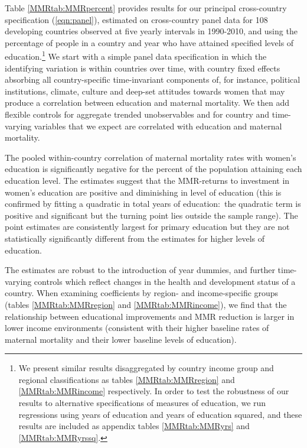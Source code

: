 \documentclass{article}[12pt,subeqn]
\begin{document}
\begin{spacing}{1.4}
Table \ref{MMRtab:MMRpercent} provides results for our principal cross-country 
specification (\ref{eqn:panel}), estimated on cross-country panel data for 108 
developing countries observed at five yearly intervals in 1990-2010, and using 
the percentage of people in a country and year who have attained specified levels
of education.\footnote{We present similar results disaggregated by country income
group and regional classifications as tables \ref{MMRtab:MMRregion} and
\ref{MMRtab:MMRincome} respectively. In order to test the robustness of our
results to alternative specifications of measures of education, we run regressions
using years of education and years of education squared, and these results are
included as appendix tables \ref{MMRtab:MMRyrs} and \ref{MMRtab:MMRyrssq}.} We
start with a simple panel data specification in which the identifying variation
is within countries over time, with country fixed effects absorbing all
country-specific time-invariant components of, for instance, political
institutions, climate, culture and deep-set attitudes towards women that may
produce a correlation between education and maternal mortality. We then add
flexible controls for aggregate trended unobservables and for country and
time-varying variables that we expect are correlated with education and maternal
mortality.

The pooled within-country correlation of maternal mortality rates with women's 
education is significantly negative for the percent of the population attaining 
each education level. The estimates suggest that the MMR-returns to investment 
in women's education are positive and diminishing in level of education
(this is confirmed by fitting a quadratic in total years of education:\ the 
quadratic term is positive and significant but the turning point lies outside 
the sample range). The point estimates are consistently largest for primary 
education but they are not statistically significantly different from the 
estimates for higher levels of education.

The estimates are robust to the introduction of year dummies, and further 
time-varying controls which reflect changes in the health and development status 
of a country. When examining coefficients by region- and income-specific groups 
(tables \ref{MMRtab:MMRregion} and \ref{MMRtab:MMRincome}), we find that the 
relationship between educational improvements and MMR reduction is larger in lower 
income environments (consistent with their higher baseline rates of maternal 
mortality and their lower baseline levels of education).


\end{spacing}
\end{document}
